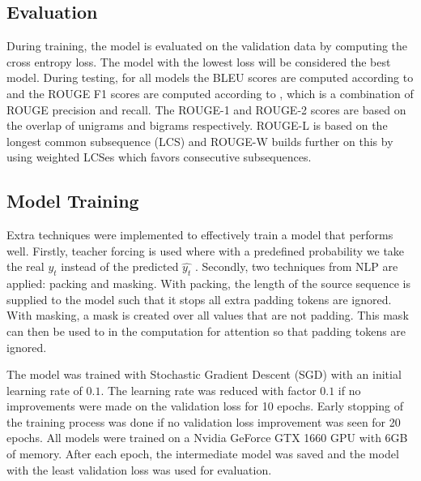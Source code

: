 \subsection{Evaluation}
During training, the model is evaluated on the validation data by computing the cross entropy loss. The model with the lowest loss will be considered the best model. 
During testing, for all models the BLEU scores are computed according to \cite{papineni_bleu:_2001} and the ROUGE F1 scores are computed according to \cite{lin_rouge:_2004}, which is a combination of ROUGE precision and recall. The ROUGE-1 and ROUGE-2 scores are based on the overlap of unigrams and bigrams respectively. ROUGE-L is based on the longest common subsequence (LCS) and ROUGE-W builds further on this by using weighted LCSes which favors consecutive subsequences.

\subsection{Model Training}\label{subsec:training}
Extra techniques were implemented to effectively train a model that performs well. Firstly, teacher forcing is used where with a predefined probability we take the real $y_t$ instead of the predicted $\hat{y_t}$ \cite{williams1989learning}. Secondly, two techniques from NLP are applied: packing and masking. With packing, the length of the source sequence is supplied to the model such that it stops all extra padding tokens are ignored. With masking, a mask is created over all values that are not padding. This mask can then be used to in the computation for attention so that padding tokens are ignored.     

The model was trained with Stochastic Gradient Descent (SGD) with an initial learning rate of $0.1$. The learning rate was reduced with factor $0.1$ if no improvements were made on the validation loss for 10 epochs. Early stopping of the training process was done if no validation loss improvement was seen for 20 epochs. All models were trained on a Nvidia GeForce GTX 1660 GPU with 6GB of memory. After each epoch, the intermediate model was saved and the model with the least validation loss was used for evaluation.
